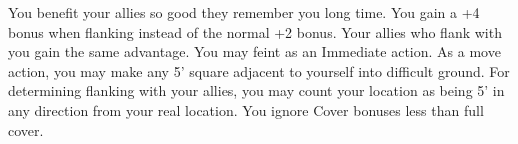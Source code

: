 \combatfeat
{You benefit your allies so good they remember you long time.}
{You gain a +4 bonus when flanking instead of the normal +2 bonus. Your allies who flank with you gain the same advantage.}
{You may feint as an Immediate action.}
{As a move action, you may make any 5' square adjacent to yourself into difficult ground.}
{For determining flanking with your allies, you may count your location as being 5' in any direction from your real location.}
{You ignore Cover bonuses less than full cover.}